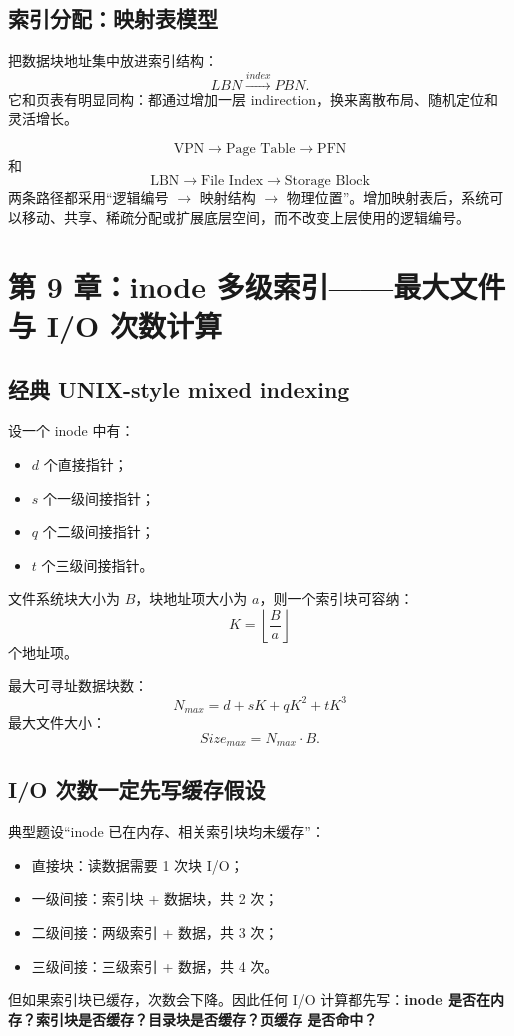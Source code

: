 \documentclass[11pt,a4paper]{ctexart}
\newcommand{\kw}[1]{\textbf{#1}}
\begin{document}
\subsection{索引分配：映射表模型}
把数据块地址集中放进索引结构：
\[
LBN\xrightarrow{index}PBN.
\]
它和页表有明显同构：都通过增加一层 indirection，换来离散布局、随机定位和灵活增长。

\begin{bridge}
\[
\text{VPN}\to\text{Page Table}\to\text{PFN}
\]
和
\[
\text{LBN}\to\text{File Index}\to\text{Storage Block}
\]
两条路径都采用“逻辑编号 $\to$ 映射结构 $\to$ 物理位置”。增加映射表后，系统可以移动、共享、稀疏分配或扩展底层空间，而不改变上层使用的逻辑编号。
\end{bridge}

\section{第 9 章：inode 多级索引——最大文件与 I/O 次数计算}

\subsection{经典 UNIX-style mixed indexing}
设一个 inode 中有：
\begin{itemize}
  \item $d$ 个直接指针；
  \item $s$ 个一级间接指针；
  \item $q$ 个二级间接指针；
  \item $t$ 个三级间接指针。
\end{itemize}
文件系统块大小为 $B$，块地址项大小为 $a$，则一个索引块可容纳：
\[
\boxed{K=\left\lfloor\frac{B}{a}\right\rfloor}
\]
个地址项。

最大可寻址数据块数：
\[
\boxed{N_{max}=d+sK+qK^2+tK^3}
\]
最大文件大小：
\[
\boxed{Size_{max}=N_{max}\cdot B}.
\]

\begin{center}

\end{center}

\subsection{I/O 次数一定先写缓存假设}
典型题设“inode 已在内存、相关索引块均未缓存”：
\begin{itemize}
  \item 直接块：读数据需要 1 次块 I/O；
  \item 一级间接：索引块 + 数据块，共 2 次；
  \item 二级间接：两级索引 + 数据，共 3 次；
  \item 三级间接：三级索引 + 数据，共 4 次。
\end{itemize}
但如果索引块已缓存，次数会下降。因此任何 I/O 计算都先写：\kw{inode 是否在内存？索引块是否缓存？目录块是否缓存？页缓存 是否命中？}
\end{document}
